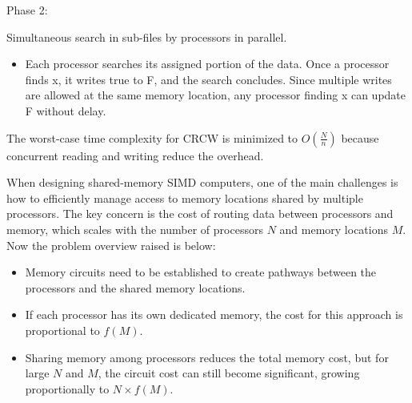 \documentclass[a4paper, 10pt]{book}
\begin{document}
\begin{tcolorbox}[colback=white, colframe=black!25, title=Example]
\begin{minipage}{0.49\linewidth}
\begin{tcolorbox}[colframe=white, size=small]
\begin{itemize}
                                \end{itemize}
    
                                {\bold Phase 2:}
                                
                                Simultaneous search in sub-files by processors in parallel.
    
                                \begin{itemize}
                                    
                                    \item Each processor searches its assigned portion of the data. Once a processor finds x, it writes true to F, and the search concludes. Since multiple writes are allowed at the same memory location, any processor finding x can update F without delay.
    
                                \end{itemize}
                                
                                The worst-case time complexity for CRCW is minimized to $O(\frac{N}{n})$ because concurrent reading and writing reduce the overhead. 
                            
                            \end{tcolorbox}
                        \end{minipage}
                    
                    \end{tcolorbox}

                    When designing shared-memory SIMD computers, one of the main challenges is how to efficiently manage access to memory locations shared by multiple processors. The key concern is the cost of routing data between processors and memory, which scales with the number of processors $N$ and memory locations $M$. Now the problem overview raised is below:

                    \begin{itemize}
                        
                        \item Memory circuits need to be established to create pathways between the processors and the shared memory locations.

                        \item If each processor has its own dedicated memory, the cost for this approach is proportional to $f(M)$.

                        \item Sharing memory among processors reduces the total memory cost, but for large $N$ and $M$, the circuit cost can still become significant, growing proportionally to $N \times f(M)$.

                    \end{itemize}
\end{document}
